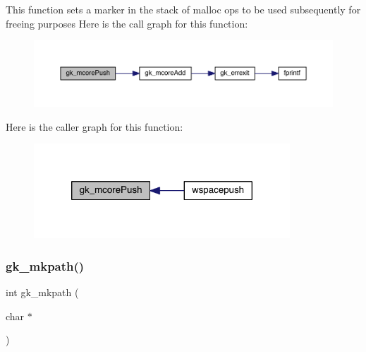 This function sets a marker in the stack of malloc ops to be used subsequently for freeing purposes Here is the call graph for this function\+:\nopagebreak
\begin{figure}[H]
\begin{center}
\leavevmode
\includegraphics[width=350pt]{a00077_a07579694837248c1f2908860edc643c0_cgraph}
\end{center}
\end{figure}
Here is the caller graph for this function\+:\nopagebreak
\begin{figure}[H]
\begin{center}
\leavevmode
\includegraphics[width=272pt]{a00077_a07579694837248c1f2908860edc643c0_icgraph}
\end{center}
\end{figure}
\mbox{\label{a00077_a89ed36115845151f1a66acabbf6b2284}} 
\subsubsection{\texorpdfstring{gk\+\_\+mkpath()}{gk\_mkpath()}}
{\footnotesize\ttfamily int gk\+\_\+mkpath (\begin{DoxyParamCaption}\item[{char $\ast$}]{ }\end{DoxyParamCaption})}

